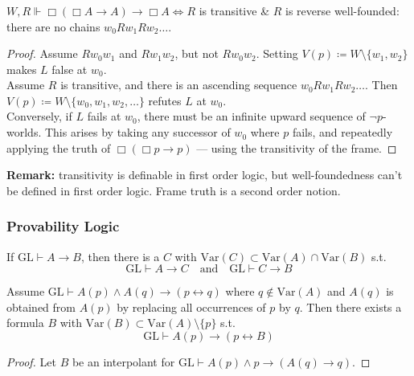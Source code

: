 \documentclass[UTF8,11pt,colorlinks,compress,openany]{beamer}%
\begin{document}
\begin{frame}\frametitle{}
\begin{theorem}
$W,R\Vdash\Box(\Box A\to A)\to\Box A \iff R$ is transitive \& $R$ is reverse well-founded: there are no chains $w_0Rw_1Rw_2\dots$.
\end{theorem}
\begin{proof}
Assume $Rw_0w_1$ and $Rw_1w_2$, but not $Rw_0w_2$. Setting $V(p)\coloneqq W\setminus\{w_1,w_2\}$ makes $L$ false at $w_0$.\\
Assume $R$ is transitive, and there is an ascending sequence $w_0Rw_1Rw_2\dots$. Then $V(p)\coloneqq W\setminus\{w_0,w_1,w_2,\dots\}$ refutes $L$ at $w_0$.\\
Conversely, if $L$ fails at $w_0$, there must be an infinite upward sequence of $\neg p$-worlds. This arises by taking any successor of $w_0$ where $p$ fails, and repeatedly applying the truth of $\Box(\Box p\to p)$ --- using the transitivity of the frame.
\end{proof}
\textbf{Remark:} transitivity is definable in first order logic, but well-foundedness can't be defined in first order logic. Frame truth is a second order notion.
\end{frame}

\begin{frame}\frametitle{Provability Logic}
\setlength\abovedisplayskip{0pt}
\setlength\belowdisplayskip{0pt}
	\begin{theorem}
		If $\mathrm{GL}\vdash A\to B$, then there is a $C$ with $\mathrm{Var}(C)\subset \mathrm{Var}(A)\cap \mathrm{Var}(B)$ s.t.
		\[\mathrm{GL}\vdash A\to C\quad\mbox{and}\quad\mathrm{GL}\vdash C\to B\]
	\end{theorem}
	\begin{corollary}
		Assume $\mathrm{GL}\vdash A(p)\wedge A(q)\to(p\leftrightarrow q)$ where $q\notin \mathrm{Var}(A)$ and $A(q)$ is obtained from $A(p)$ by replacing all occurrences of $p$ by $q$. Then there exists a formula $B$ with $\mathrm{Var}(B)\subset \mathrm{Var}(A)\setminus\{p\}$ s.t.
		\[\mathrm{GL}\vdash A(p)\to(p\leftrightarrow B)\]
	\end{corollary}
	\begin{proof}
		Let $B$ be an interpolant for $\mathrm{GL}\vdash A(p)\wedge p\to(A(q)\to q)$.
	\end{proof}
\end{frame}
\end{document}

